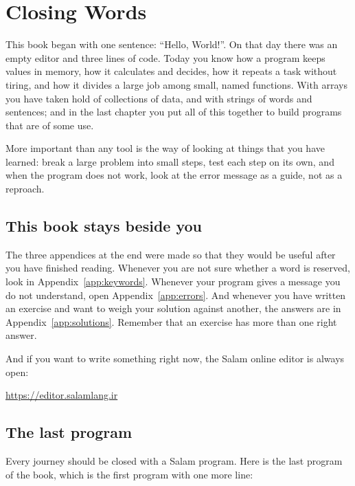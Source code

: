 \chapter*{Closing Words}

This book began with one sentence: ``Hello, World!''. On that day there was
an empty editor and three lines of code. Today you know how a program keeps
values in memory, how it calculates and decides, how it repeats a task
without tiring, and how it divides a large job among small, named
functions. With arrays you have taken hold of collections of data, and with
strings of words and sentences; and in the last chapter you put all of this
together to build programs that are of some use.

More important than any tool is the way of looking at things that you have
learned: break a large problem into small steps, test each step on its own,
and when the program does not work, look at the error message as a guide,
not as a reproach.

\section*{This book stays beside you}

The three appendices at the end were made so that they would be useful after
you have finished reading. Whenever you are not sure whether a word is
reserved, look in Appendix~\ref{app:keywords}. Whenever your program gives a
message you do not understand, open Appendix~\ref{app:errors}. And whenever
you have written an exercise and want to weigh your solution against
another, the answers are in Appendix~\ref{app:solutions}. Remember that an
exercise has more than one right answer.

And if you want to write something right now, the Salam online editor is
always open:
\begin{center}
\url{https://editor.salamlang.ir}
\end{center}

\section*{The last program}

Every journey should be closed with a Salam program. Here is the last
program of the book, which is the first program with one more line:

